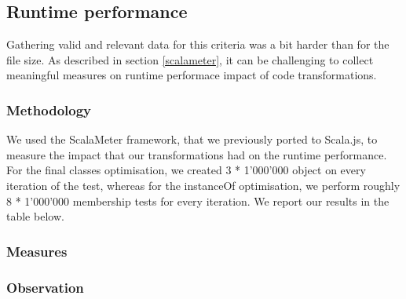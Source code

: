 \subsection{Runtime performance}
Gathering valid and relevant data for this criteria was a bit harder than for
the file size. As described in section \ref{scalameter}, it can be challenging
to collect meaningful measures on runtime performace impact of code
transformations.

\subsubsection{Methodology}
We used the ScalaMeter framework, that we previously ported to Scala.js, to
measure the impact that our transformations had on the runtime performance.
For the final classes optimisation, we created 3 * 1'000'000 object on every
iteration of the test, whereas for the instanceOf optimisation, we perform
roughly 8 * 1'000'000 membership tests for every iteration. We report our
results in the table below.


\subsubsection{Measures}

\subsubsection{Observation}

